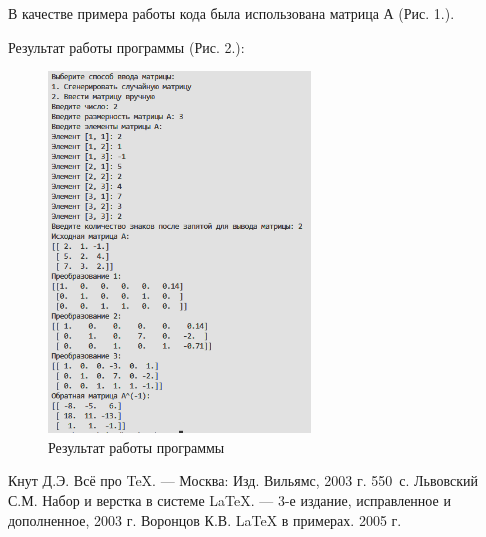 \documentclass[12pt,a4paper]{scrartcl}
\begin{document}
В качестве примера работы кода была использована матрица А (Рис. 1.).

Результат работы программы (Рис. 2.):

\begin{figure}[h]
 \centering
 \includegraphics[width=0.62\textwidth]{2.png}
 \caption{Результат работы программы}\label{fig:par}
\end{figure}

\begin{thebibliography}{9}
Кнут Д.Э. Всё про \TeX. \newblock --- Москва: Изд. Вильямс, 2003 г. 550~с.
Львовский С.М. Набор и верстка в системе \LaTeX{}. \newblock --- 3-е издание, исправленное и дополненное, 2003 г.
Воронцов К.В. \LaTeX{} в примерах. 2005 г.
\end{thebibliography}
\end{document}

